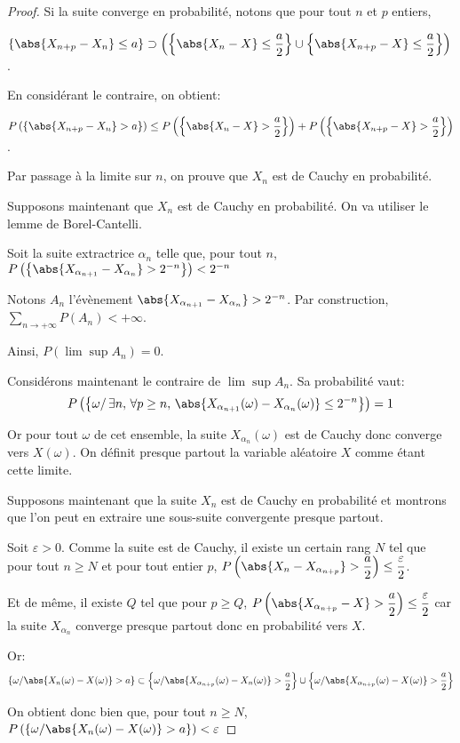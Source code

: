 \begin{proof}
Si la suite converge en probabilité, notons que pour tout $n$ et $p$ entiers,

$\left \{ \abs{X_{n+p}-X_n} \leq a \right \} \supset \left(\left \{ \abs{X_{n}-X} \leq \dfrac{a}{2} \right \} \cup \left \{ \abs{X_{n+p}-X} \leq \dfrac{a}{2}\right \}\right)$.

En considérant le contraire, on obtient:

$P\left(\left \{ \abs{X_{n+p}-X_n} > a \right \}\right) \leq P\left(\left \{ \abs{X_{n}-X} > \dfrac{a}{2} \right \}\right) + P\left(\left \{ \abs{X_{n+p}-X} > \dfrac{a}{2}\right \}\right)$.

Par passage à la limite sur $n$, on prouve que $X_n$ est de Cauchy en probabilité.

Supposons maintenant que $X_n$ est de Cauchy en probabilité. On va utiliser le lemme de Borel-Cantelli. 

Soit la suite extractrice $\alpha_n$ telle que, pour tout $n$,
$
P\left(\left \{ \abs{X_{\alpha_{n+1}}-X_{\alpha_n}} > 2^{-n} \right \}\right) < 2^{-n}
$

Notons $A_n$ l'évènement $\abs{X_{\alpha_{n+1}}-X_{\alpha_n}} > 2^{-n}$. 
Par construction, $\displaystyle{\sum \limits_{n \to +\infty}} P(A_n) < +\infty$.

Ainsi, $P\left(\lim \sup A_n\right)=0$. 

Considérons maintenant le contraire de $\lim \sup A_n$. Sa probabilité vaut:
\[
P\left(\left\{ \omega/ \, \exists n, \, \forall p \geq n, \, \abs{X_{\alpha_{n+1}}(\omega)-X_{\alpha_n}(\omega)}\leq 2^{-n} \right \} \right)=1
\]

Or pour tout $\omega$ de cet ensemble, la suite $X_{\alpha_n}(\omega)$ est de Cauchy donc converge vers $X(\omega)$. On définit presque partout la variable aléatoire $X$ comme étant cette limite.

Supposons maintenant que la suite $X_n$ est de Cauchy en probabilité et montrons que l'on peut en extraire une sous-suite convergente presque partout.

Soit $\varepsilon > 0$. Comme la suite est de Cauchy, il existe un certain rang $N$ tel que pour tout $n \geq N$ et pour tout entier $p$, 
$P\left(\abs{X_n-X_{\alpha_{n+p}}}>\dfrac{a}{2}\right) \leq \dfrac{\varepsilon}{2}$.

Et de même, il existe $Q$ tel que pour $p \geq Q$, 
$P\left(\abs{X_{\alpha_{n+p}}-X}>\dfrac{a}{2}\right) \leq \dfrac{\varepsilon}{2}$ car la suite $X_{\alpha_n}$ converge presque partout donc en probabilité vers $X$.

Or:
\[\left\{\omega/ \abs{X_n(\omega)-X(\omega)}>a \right \} \subset \left\{\omega/ \abs{X_{\alpha_{n+p}}(\omega)-X_n(\omega)}>\dfrac{a}{2} \right \} \cup \left\{\omega/ \abs{X_{\alpha_{n+p}}(\omega)-X(\omega)}>\dfrac{a}{2} \right \}
\]

On obtient donc bien que, pour tout $n \geq N$,
$P\left(\left\{\omega/ \abs{X_n(\omega)-X(\omega)}>a \right \}\right) < \varepsilon$
\end{proof}


